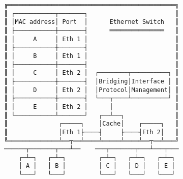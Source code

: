 \documentclass[varwidth,crop]{standalone}
\begin{document}
\begin{verbatim}
╔══════════════════════════════════════════════╗
║ ┌───────────┬───────┐                        ║
║ │MAC address│ Port  │      Ethernet Switch   ║
║ ├───────────┼───────┤      ═══════════════   ║
║ │     A     │ Eth 1 │                        ║
║ ├───────────┼───────┤                        ║
║ │     B     │ Eth 1 │                        ║
║ ├───────────┼───────┤                        ║
║ │     C     │ Eth 2 │  ┌────────┬──────────┐ ║
║ ├───────────┼───────┤  │Bridging│Interface │ ║
║ │     D     │ Eth 2 │  │Protocol│Management│ ║
║ ├───────────┼───────┤  └───┬────┴──────────┘ ║
║ │     E     │ Eth 2 │      │                 ║
║ └───────────┴───────┘   ┌──┴──┐              ║
║              ┌─────┐    │Cache│    ┌─────┐   ║
║              │Eth 1├────┤     ├────┤Eth 2│   ║
╚══════════════╧══┬══╧════╧═════╧════╧══┬══╧═══╝
──────┬───────┬───┴──    ───┬───────┬───┴───┬───
    ┌─┴─┐   ┌─┴─┐         ┌─┴─┐   ┌─┴─┐   ┌─┴─┐
    │ A │   │ B │         │ C │   │ D │   │ E │
    └───┘   └───┘         └───┘   └───┘   └───┘
\end{verbatim}
\end{document}
